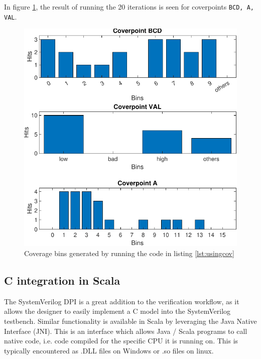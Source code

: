 \documentclass[conference]{IEEEtran}
\newcommand{\SV}{SystemVerilog\xspace}
\begin{document}

In figure \ref{fig:coverage}, the result of running the 20 iterations is seen for coverpoints \texttt{BCD, A, VAL}. 

\begin{figure}[htbp]
	\centering
	\includegraphics[width=\columnwidth]{coverage.pdf}
	\caption{Coverage bins generated by running the code in listing \ref{lst:usingcov}}
\label{fig:coverage}
\end{figure}

\subsection{C integration in Scala}
The \SV DPI is a great addition to the verification workflow, as it allows the designer to easily implement a C model into the \SV testbench.
Similar functionality is available in Scala by leveraging the Java Native Interface (JNI). This is an interface which allows Java / Scala programs to call native code, i.e. code compiled for the specific CPU it is running on. This is typically encountered as .DLL files on Windows or .so files on linux.
\end{document}
